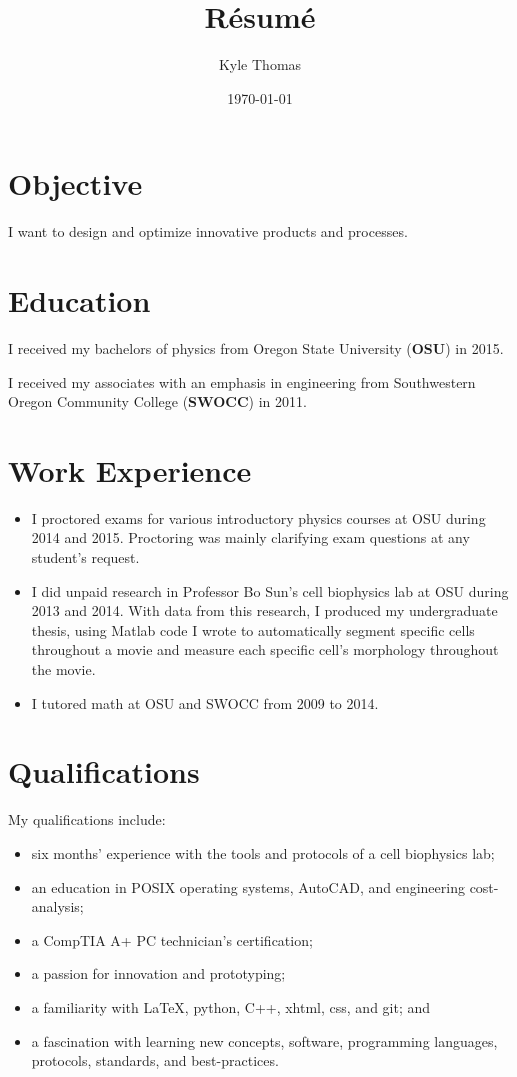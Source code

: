 \documentclass[ notitlepage, prl]{ revtex4-1}
\begin{document}
\author{Kyle Thomas}
\title{R\'esum\'e}
\date{\today}
\maketitle
\section*{Objective}
\par I want to design and optimize innovative products and processes.
\section*{Education}
\par I received my bachelors of physics from Oregon State University (\textbf {OSU}) in 2015.
\par I received my associates with an emphasis in engineering from Southwestern Oregon Community College (\textbf {SWOCC}) in 2011.
\section*{Work Experience}
\begin{itemize}
\item I proctored exams for various introductory physics courses at OSU during 2014 and 2015. Proctoring was mainly clarifying exam questions at any student's request.
\item I did unpaid research in Professor Bo Sun's cell biophysics lab at OSU during 2013 and 2014. 
With data from this research, I produced my undergraduate thesis, using Matlab code I wrote to 
automatically segment specific cells throughout a movie and 
measure each specific cell's morphology throughout the movie.
\item I tutored math at OSU and SWOCC from 2009 to 2014.
\end{itemize}

\section*{Qualifications}
My qualifications include:
\begin{itemize}
\item six months' experience with the tools and protocols of a cell biophysics lab;
\item an education in POSIX operating systems, AutoCAD, and engineering cost-analysis;
\item a CompTIA A+ PC technician's certification;
\item a passion for innovation and prototyping;
\item a familiarity with \LaTeX, python, C++, xhtml, css, and git; and
\item a fascination with learning new concepts, software, programming languages, protocols, standards, and best-practices.
\end{itemize}
\end{document}
